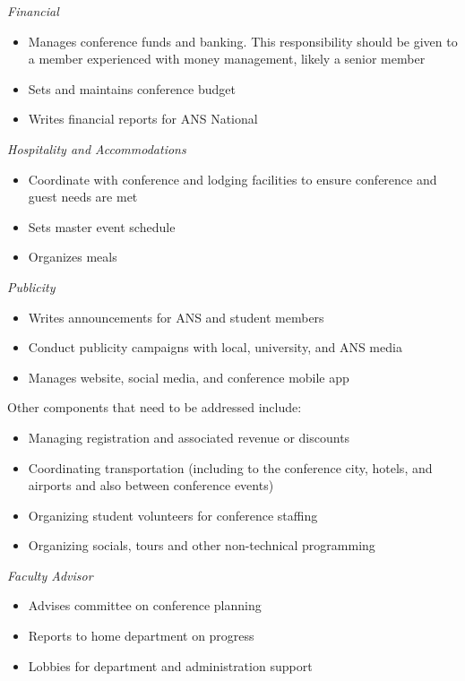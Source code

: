 \documentclass[12pt]{article}
\begin{document}
\emph{Financial}
\begin{itemize}
    \item Manages conference funds and banking. This responsibility should be given to a member experienced with money management, likely a senior member
    \item Sets and maintains conference budget
    \item Writes financial reports for ANS National
\end{itemize}

\emph{Hospitality and Accommodations}
\begin{itemize}
    \item Coordinate with conference and lodging facilities to ensure conference and guest needs are met
    \item Sets master event schedule
    \item Organizes meals
\end{itemize}

\emph{Publicity}
\begin{itemize}
    \item Writes announcements for ANS and student members
    \item Conduct publicity campaigns with local, university, and ANS media
    \item Manages website, social media, and conference mobile app
\end{itemize}

Other components that need to be addressed include:
\begin{itemize}
    \item Managing registration and associated revenue or discounts
    \item Coordinating transportation (including to the conference city, hotels, and airports and also between conference events)
    \item Organizing student volunteers for conference staffing
    \item Organizing socials, tours and other non-technical programming
\end{itemize}

\emph{Faculty Advisor}
\begin{itemize}
    \item Advises committee on conference planning
    \item Reports to home department on progress
    \item Lobbies for department and administration support
\end{itemize}
\end{document}
